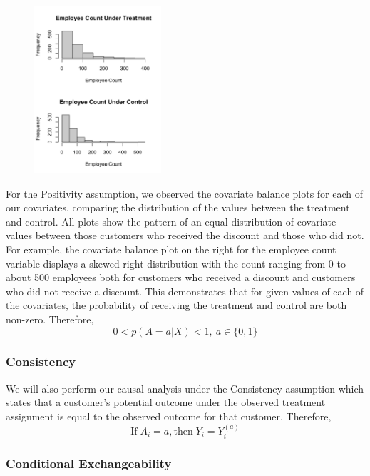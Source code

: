 \documentclass{article}
\begin{document}
\begin{figure}
\centering
\includegraphics[width=0.42\textwidth]{figs/emp.png}
\end{figure}

For the Positivity assumption, we observed the covariate balance plots for each of our covariates, comparing the distribution of the values between the treatment and control. All plots show the pattern of an equal distribution of covariate values between those customers who received the discount and those who did not. For example, the covariate balance plot on the right for the employee count variable displays a skewed right distribution with the count ranging from 0 to about 500 employees both for customers who received a discount and customers who did not receive a discount. This demonstrates that for given values of each of the covariates, the probability of receiving the treatment and control are both non-zero. Therefore,
\[
0<p(A = a|X)<1,\:a\in\{0,1\}
\]
\subsubsection{Consistency}

We will also perform our causal analysis under the Consistency assumption which states that a customer's potential outcome under the observed treatment assignment is equal to the observed outcome for that customer. Therefore,
\[
\text{If} \; A_i = a, \text{then}\; Y_i = Y_i^{(a)}
\]
\subsubsection{Conditional Exchangeability}
\end{document}
